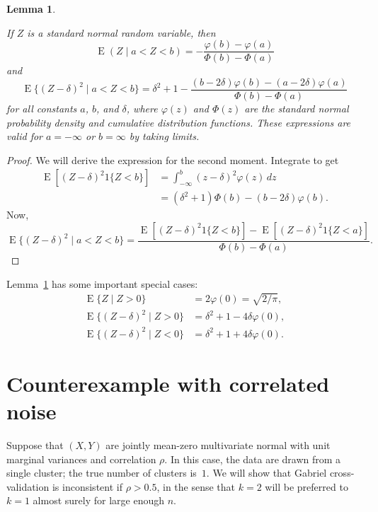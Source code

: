 \documentclass[11pt]{article}
\newtheorem{lemma}{Lemma}
\newcommand{\E}{\operatorname{E}}
\begin{document}
\begin{lemma}\label{lem:truncated-normal-moments}

If $Z$ is a standard normal random variable, then
\[
  \E(Z \mid a < Z < b)
    = - \frac{\varphi(b) - \varphi(a)}
             {\Phi(b) - \Phi(a)}
\]
and
\[
  \E\{(Z - \delta)^2 \mid a < Z < b\}
    = \delta^2 + 1
    - \frac{  (b - 2 \delta) \varphi(b)
            - (a - 2 \delta) \varphi(a)}
           {\Phi(b) - \Phi(a)}
\]
for all constants $a$, $b$, and $\delta$, where $\varphi(z)$ and $\Phi(z)$ are
the standard normal probability density and cumulative distribution functions.
These expressions are valid for $a = -\infty$ or $b = \infty$ by taking
limits.

\end{lemma}
\begin{proof}
We will derive the expression for the second moment.  Integrate to get
\begin{align*}
  \E[ (Z - \delta)^2 1\{Z < b\}]
    &= \int_{-\infty}^b (z - \delta)^2 \varphi(z) \, dz \\
    &= (\delta^2 + 1) \Phi(b) - (b - 2 \delta) \varphi(b).
\end{align*}
Now,
\[
  \E\{(Z - \delta)^2 \mid a < Z < b\}
    =
    \frac{  \E[ (Z - \delta)^2 1\{Z < b\}]
          - \E[ (Z - \delta)^2 1\{Z < a\}]}
         { \Phi(b) - \Phi(a) }.
\]
\end{proof}

Lemma~\ref{lem:truncated-normal-moments} has some important special cases:
\begin{align*}
  \E\{Z \mid Z > 0\} &= 2 \varphi(0) = \sqrt{2 / \pi}, \\
  \E\{(Z - \delta)^2 \mid Z > 0 \}
    &= \delta^2 + 1 - 4 \delta \varphi(0), \\
  \E\{(Z - \delta)^2 \mid Z < 0 \}
    &= \delta^2 + 1 + 4 \delta \varphi(0).
\end{align*}


\section{Counterexample with correlated noise}

Suppose that $(X, Y)$ are jointly mean-zero multivariate normal with unit
marginal variances and correlation $\rho$.  In this case, the data are drawn
from a single cluster; the true number of clusters is~$1$.  We will show that
Gabriel cross-validation is inconsistent if $\rho > 0.5$, in the sense that $k
= 2$ will be preferred to $k = 1$ almost surely for large enough $n$.
\end{document}
